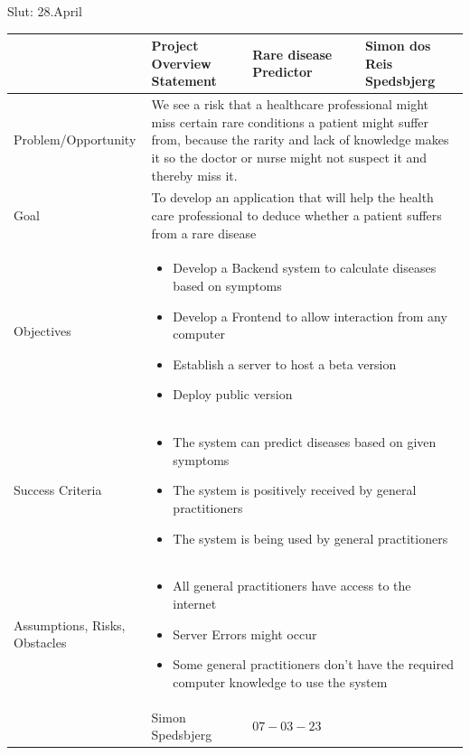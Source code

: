 Slut: 28.April
\begin{center}
	\begin{tabular}[h]{|p{7em}|p{5em}|p{5em}|p{5em}|p{5em}|}
		\hline
		& {\scriptsize Project Overview Statement} & {\scriptsize Rare disease Predictor} & & {\scriptsize Simon dos Reis Spedsbjerg} \\ \hline
		{\scriptsize Problem/Opportunity} & \multicolumn{4}{|p{20em}|}{\scriptsize We see a risk that a healthcare professional might miss certain rare conditions a patient might suffer from, because the rarity and lack of knowledge makes it so the doctor or nurse might not suspect it and thereby miss it.}\\ \hline
		{\scriptsize Goal} & \multicolumn{4}{|p{20em}|}{\scriptsize To develop an application that will help the health care professional to deduce whether a patient suffers from a rare disease}\\ \hline
		{\scriptsize Objectives} & \multicolumn{4}{|p{20em}|}{\scriptsize \begin{itemize}
		\item Develop a Backend system to calculate diseases based on symptoms
		\item Develop a Frontend to allow interaction from any computer
		\item Establish a server to host a beta version
		\item Deploy public version
			 \end{itemize}
		 } \\ \hline
	 {\scriptsize Success Criteria} & \multicolumn{4}{|p{20em}|}{\scriptsize\begin{itemize}
	 	\item The system can predict diseases based on given symptoms
	 	\item The system is positively received by general practitioners
	 	\item The system is being used by general practitioners
	 \end{itemize}} \\ \hline
 	{\scriptsize Assumptions, Risks, Obstacles} & \multicolumn{4}{|p{20em}|}{\scriptsize
 	\begin{itemize}
 		\item All general practitioners have access to the internet
 		\item Server Errors might occur
 		\item Some general practitioners don't have the required computer knowledge to use the system
 	\end{itemize}	
 }\\ \hline
& {\scriptsize Simon Spedsbjerg} & {\scriptsize $07-03-23$} & & \\ \hline
	\end{tabular}
\end{center}
